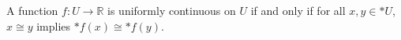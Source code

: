 A function $f: U \to \mathbb{R}$ is uniformly continuous on $U$ if and only if for all $x, y \in *U$, $x \cong y$ implies $*f(x) \cong *f(y)$.
